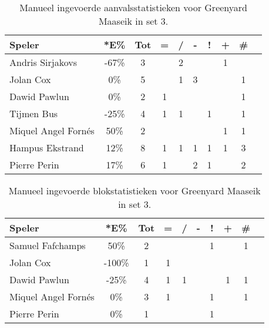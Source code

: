 \begin{table}[ht!]
    \centering
    \scriptsize
    \begin{tabular}{|l|c|c|c|c|c|c|c|c|c|} \hline
        \textbf{Speler} & *E\% & Tot & = & / & - & ! & + & \#\\ \hline
        Andris Sirjakovs & -67\% & 3 &  & 2 &  &  & 1 &  \\ 
        Jolan Cox & 0\% & 5 &  & 1 & 3 &  &  & 1 \\ 
        Dawid Pawlun & 0\% & 2 & 1 &  &  &  &  & 1 \\ 
        Tijmen Bus & -25\% & 4 & 1 & 1 &  & 1 &  & 1 \\ 
        Miquel Angel Fornés & 50\% & 2 &  &  &  &  & 1 & 1 \\ 
        Hampus Ekstrand & 12\% & 8 & 1 & 1 & 1 & 1 & 1 & 3 \\ 
        Pierre Perin  & 17\% & 6 & 1 &  & 2 & 1 &  & 2 \\ \hline
    \end{tabular}
   \caption[Manueel ingevoerde aanvalsstatistieken voor Greenyard Maaseik in set 3]{\label{tab:PL1AttMaaseikMan3}Manueel ingevoerde aanvalsstatistieken voor Greenyard Maaseik in set 3.}
\end{table}

\begin{table}[ht!]
    \centering
    \scriptsize
    \begin{tabular}{|l|c|c|c|c|c|c|c|c|c|} \hline
        \textbf{Speler} & *E\% & Tot & = & / & - & ! & + & \#\\ \hline
        Samuel Fafchamps & 50\% & 2 &  &  &  & 1 &  & 1 \\ 
        Jolan Cox & -100\% & 1 & 1 &  &  &  &  &  \\
        Dawid Pawlun & -25\% & 4 & 1 & 1 &  &  & 1 & 1 \\
        Miquel Angel Fornés & 0\% & 3 & 1 &  &  & 1 &  & 1 \\ 
        Pierre Perin & 0\% & 1 &  &  &  & 1 &  &  \\ \hline
    \end{tabular}
    \caption[Manueel ingevoerde blokstatistieken voor Greenyard Maaseik in set 3]{\label{tab:PL1BlockMaaseikMan3}Manueel ingevoerde blokstatistieken voor Greenyard Maaseik in set 3.}
\end{table}

